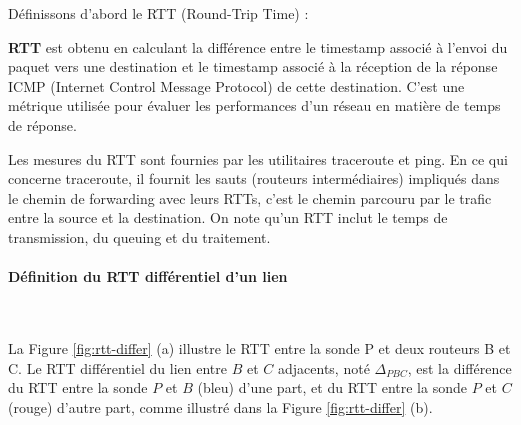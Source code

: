 Définissons d'abord le  RTT (Round-Trip Time) :
\begin{tcolorbox}
	\textbf{RTT} est obtenu en calculant la différence entre le timestamp associé à l'envoi du paquet vers une destination  et le timestamp associé à la réception de la réponse ICMP (Internet Control Message Protocol) de cette destination. C'est une métrique utilisée pour évaluer les performances d'un réseau en matière de temps de réponse. 
\end{tcolorbox}
Les mesures du RTT sont fournies par les utilitaires traceroute et ping. En ce qui concerne traceroute,  il fournit les sauts (routeurs intermédiaires) impliqués dans le  chemin de forwarding avec leurs RTTs, c'est le chemin parcouru par le trafic entre la source et la destination. On note qu'un  RTT inclut le temps de transmission, du queuing et  du traitement. 

\paragraph{Définition du RTT différentiel d'un lien }~

La Figure 	\ref{fig:rtt-differ} (a)  illustre le RTT entre la sonde P et deux routeurs B et C. Le RTT différentiel  du lien entre  $B$ et $C$ adjacents, noté $\Delta_{PBC}$, est la différence du RTT entre la sonde $P$ et $B$ (bleu) d'une part, et du RTT entre la sonde $P$ et $C$  (rouge) d'autre part, comme   illustré dans la Figure	\ref{fig:rtt-differ} (b). 

